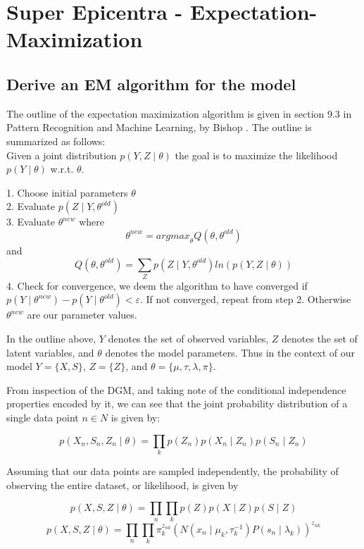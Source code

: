 \documentclass[11pt,a4paper]{article}
\begin{document}
\section{Super Epicentra - Expectation-Maximization}

\subsection{Derive an EM algorithm for the model}

The outline of the expectation maximization algorithm is given in section 9.3 in Pattern Recognition and Machine Learning, by Bishop \cite{book}. The outline is summarized as follows:\\

Given a joint distribution $p(Y, Z \mid \theta)$ the goal is to maximize the likelihood $p(Y \mid \theta)$ w.r.t. $\theta$.
\begin{flushleft}

1.	Choose initial parameters $\theta$\\
2. 	Evaluate $p(Z \mid Y, \theta^{old})$\\
3.	Evaluate $\theta^{new}$ where
$$ \theta^{new} = {arg max}_{\theta} Q(\theta, \theta^{old})$$
and
$$ Q(\theta, \theta^{old}) = \sum_{Z} p(Z \mid Y, \theta^{old})ln(p(Y, Z \mid \theta))$$
4.	Check for convergence, we deem the algorithm to have converged if $p(Y \mid \theta^{new}) - p(Y \mid \theta^{old}) < \varepsilon $. If not converged, repeat from step 2. Otherwise $\theta^{new}$ are our parameter values.

\end{flushleft}

In the outline above, $Y$ denotes the set of observed variables, $Z$ denotes the set of latent variables, and $\theta$ denotes the model parameters. Thus in the context of our model $Y = \lbrace X, S\rbrace$, $Z = \lbrace Z \rbrace$, and $\theta = \lbrace \mu, \tau, \lambda, \pi\rbrace$.

From inspection of the DGM, and taking note of the conditional independence properties encoded by it, we can see that the joint probability distribution of a single data point $n \in N$ is given by:

$$ p(X_{n}, S_{n}, Z_{n} \mid \theta) = \prod_{k} p(Z_{n})p(X_{n} \mid Z_{n})p(S_{n} \mid Z_{n}) $$

Assuming that our data points are sampled independently, the probability of observing the entire dataset, or likelihood, is given by

$$ p(X, S, Z \mid \theta) = \prod_{n} \prod_{k} p(Z)p(X \mid Z)p(S \mid Z) $$
$$ p(X, S, Z \mid \theta) = \prod_{n} \prod_{k} \pi_{k}^{z_{nk}}(N(x_{n} \mid \mu_{k}, \tau_{k}^{-1})P(s_{n} \mid \lambda_{k}))^{z_{nk}} $$
\end{document}
